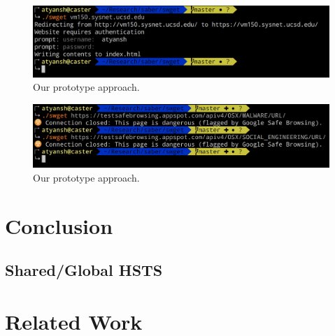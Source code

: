 \begin{figure}[h]
  \includegraphics[width=\textwidth]{figures/basic-auth}
  \caption[Prototype saber approach]{Our prototype approach.} 
  \label{fig:basic-auth-saber}
\end{figure}

\begin{figure}[h]
  \includegraphics[width=\textwidth]{figures/malware}
  \caption[Prototype saber approach]{Our prototype approach.} 
  \label{fig:malware-saber}
\end{figure}

\section{Conclusion}
\label{sec:conclusion-saber}

\subsection{Shared/Global HSTS}

\section{Related Work}
\label{sec:related-saber}
